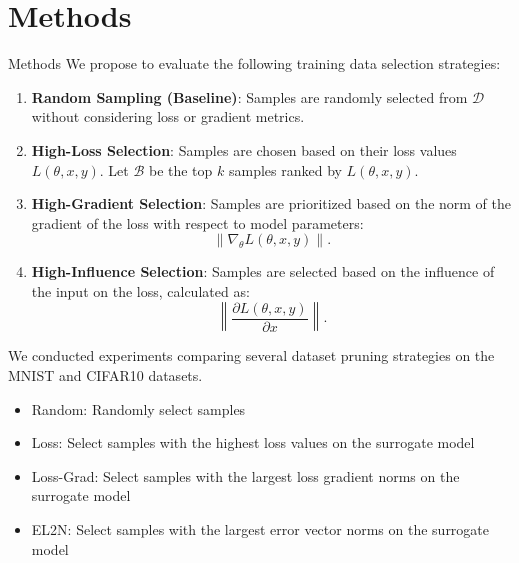 \documentclass{ctexbeamer}
\begin{document}
\section{Methods}
\begin{frame}[allowframebreaks]{Methods}
    We propose to evaluate the following training data selection strategies:
    \begin{enumerate}
        \item \textbf{Random Sampling (Baseline)}: Samples are randomly selected from $\mathcal{D}$ without considering loss or gradient metrics.
        \item \textbf{High-Loss Selection}\cite{Loss}: Samples are chosen based on their loss values $L(\theta, x, y)$. Let $\mathcal{B}$ be the top $k$ samples ranked by $L(\theta, x, y)$.
        \item \textbf{High-Gradient Selection}\cite{Gradient}: Samples are prioritized based on the norm of the gradient of the loss with respect to model parameters:
        \[\|\nabla_\theta L(\theta, x, y)\|.\]
        \item \textbf{High-Influence Selection}\cite{Influence}: Samples are selected based on the influence of the input on the loss, calculated as:
        \[\left\|\frac{\partial L(\theta, x, y)}{\partial x}\right\|.\]
        
    \end{enumerate}

    We conducted experiments comparing several dataset pruning strategies on the MNIST and CIFAR10 datasets.
    \begin{itemize}
        \item Random: Randomly select samples
        \item Loss: Select samples with the highest loss values on the surrogate model
        \item Loss-Grad: Select samples with the largest loss gradient norms on the surrogate model
        \item EL2N\cite{paul2021deep}: Select samples with the largest error vector norms on the surrogate model
    \end{itemize}
\end{frame}
\end{document}
